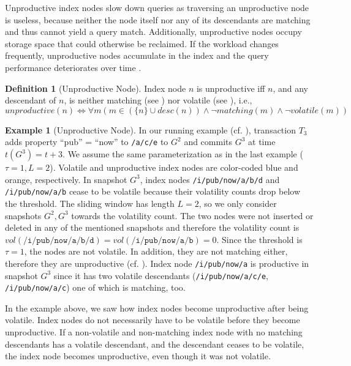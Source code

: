 \documentclass[abstracton,12pt]{scrartcl}
\theoremstyle{definition}
\newtheorem{definition}{Definition}
\newtheorem{example}{Example}
\begin{document}
Unproductive index nodes slow down
queries as traversing an unproductive node is useless, because neither the node
itself nor any of its descendants are matching and thus cannot
yield a query match. Additionally, unproductive nodes occupy storage space that
could otherwise be reclaimed. If the workload changes frequently, unproductive
nodes accumulate in the index and the query performance deteriorates
over time \cite{KW17}.

\begin{definition}[Unproductive Node]
  Index node $n$ is unproductive iff $n$, and any descendant of
  $n$, is neither matching (see ) nor volatile (see
  ), i.e.,
  $$ unproductive(n) \iff \forall  m (m \in (\{n\} \cup desc(n)) \land
  \neg matching(m) \land \neg volatile(m))$$
  \label{def:unproductive-node}
\end{definition}

\vspace{-0.6cm}

\begin{example}[Unproductive Node]
  In our running example (cf. ), transaction $T_3$ adds
  property ``pub'' = ``now'' to \texttt{/a/c/e} to $G^2$ and commits $G^3$ at time
  $t(G^3) = t+3$. We assume the same parameterization as in the last example
  ($\tau = 1, L = 2$). Volatile and unproductive index nodes are color-coded
  blue and orange, respectively.
  In snapshot $G^3$, index nodes \texttt{/i/pub/now/a/b/d} and
  \texttt{/i/pub/now/a/b} cease to be volatile because their 
  volatility counts drop below the threshold. The sliding window has length $L =
  2$, so we only consider snapshots $G^2,G^3$ towards the volatility count. The two
  nodes were not inserted or deleted in any of the mentioned snapshots and
  therefore the volatility count is $vol(\texttt{/i/pub/now/a/b/d}) =
  vol(\texttt{/i/pub/now/a/b}) = 0$. Since the threshold is $\tau = 1$, the nodes are
  not volatile. In addition,
  they are not matching either, therefore they are unproductive (cf.
  ). Index node
  \texttt{/i/pub/now/a} is productive in snapshot $G^3$ since it has
  two volatile descendants (\texttt{/i/pub/now/a/c/e}, \texttt{/i/pub/now/a/c}) 
  one of which is matching, too.
  \label{ex:unproductive-node}
\end{example}

In the example above, we saw how index nodes become unproductive after being
volatile. Index nodes do not necessarily have to be volatile before they become
unproductive.
If a non-volatile and non-matching index node with no matching descendants has a
volatile descendant, and the descendant ceases to
be volatile, the index node becomes unproductive, even though it was not
volatile.
\end{document}
